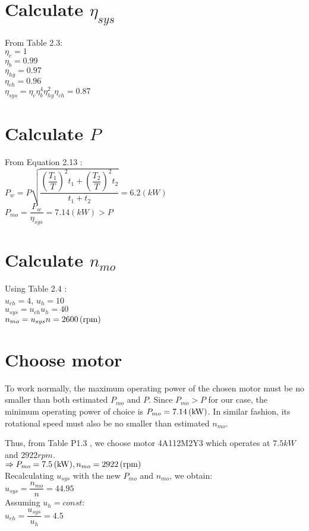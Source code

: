 \section{Calculate $ \eta_{sys} $}
From Table 2.3:\\
$ \eta_c = 1 $\\
$ \eta_b = 0.99 $\\
$ \eta_{hg} = 0.97 $\\
$ \eta_{ch} = 0.96 $\\
$ \eta_{sys} = \eta_c\eta_b^4\eta_{hg}^2\eta_{ch} = 0.87 $

\section{Calculate $ P $}
From Equation 2.13 \cite{tk1}:\\
$ P_w = P\sqrt{\dfrac{\left(\dfrac{T_1}{T}\right)^2t_1 + \left(\dfrac{T_2}{T}\right)^2t_2}{t_1+t_2}} = 6.2 \unit{(kW)} $\\
$ P_{mo} = \dfrac{P_w}{\eta_{sys}} = 7.14\unit{(kW)} > P$

\section{Calculate $ n_{mo} $}
Using Table 2.4 \cite{tk1}:\\
$ u_{ch} = 4$, $ u_{h} = 10$\\
$ u_{sys} = u_{ch}u_{h} = 40 $\\
$ n_{mo} = u_{sys}n = 2600  \, (\mathrm{rpm}) $
\section{Choose motor}
To work normally, the maximum operating power of the chosen motor must be no smaller than both estimated $ P_{mo} $ and $ P $. Since $ P_{mo} > P $ for our case, the minimum operating power of choice is $ P_{mo}=7.14\, (\mathrm{kW}) $. In similar fashion, its rotational speed must also be no smaller than estimated $ n_{mo} $.

Thus, from Table P1.3 \cite{tk1}, we choose motor 4A112M2Y3 which operates at $ 7.5\unit{kW} $ and $ 2922\unit{rpm} $.\\
$\Rightarrow P_{mo} = 7.5\, (\mathrm{kW}), n_{mo} = 2922\, (\mathrm{rpm})$\\
Recalculating $ u_{sys} $ with the new $ P_{mo} $ and $ n_{mo} $, we obtain:\\
$ u_{sys} = \dfrac{n_{mo}}{n} = 44.95	$\\
Assuming $ u_{h} = const $:\\
$ u_{ch} = \dfrac{u_{sys}}{u_{h}} = 4.5$

